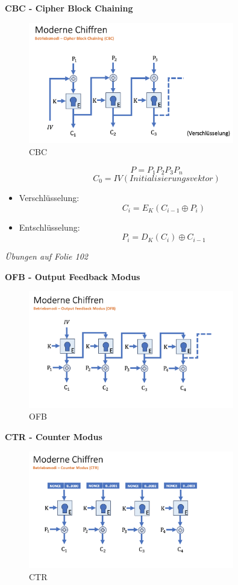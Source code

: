\documentclass[a4paper,12pt]{article}
\begin{document}
\vspace{1em}
\noindent\textbf{CBC - Cipher Block Chaining}
\begin{figure}[H]
    \centering
    \includegraphics[width=0.8\textwidth]{bilder/cbc.png}
    \caption{CBC}
    \label{fig:cbc}
\end{figure}
\[ P = P_{1}P_{2}P_{3}P_{n}\]
\[C_{0} = IV (Initialisierungsvektor)\]
\begin{itemize}
    \item Verschlüsselung: \[C_{i}=E_{K}(C_{i-1}\oplus P_{i})\]
    \item Entschlüsselung: \[P_{i} = D_{K}(C_{i}) \oplus C_{i-1}\]
\end{itemize}
\textit{Übungen auf Folie 102}

\vspace{1em}
\noindent\textbf{OFB - Output Feedback Modus}
\begin{figure}[H]
    \centering
    \includegraphics[width=0.8\textwidth]{bilder/ofb.png}
    \caption{OFB}
    \label{fig:ofb}
\end{figure}

\vspace{1em}
\noindent\textbf{CTR - Counter Modus}
\begin{figure}[H]
    \centering
    \includegraphics[width=0.8\textwidth]{bilder/ctr.png}
    \caption{CTR}
    \label{fig:ctr}
\end{figure}
\end{document}

